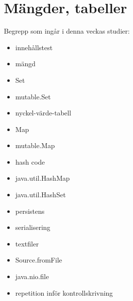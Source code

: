\chapter{Mängder, tabeller}\label{chapter:W07}
Begrepp som ingår i denna veckas studier:
\begin{itemize}[noitemsep,label={$\square$},leftmargin=*]
\item innehållstest
\item mängd
\item Set
\item mutable.Set
\item nyckel-värde-tabell
\item Map
\item mutable.Map
\item hash code
\item java.util.HashMap
\item java.util.HashSet
\item persistens
\item serialisering
\item textfiler
\item Source.fromFile
\item java.nio.file
\item repetition inför kontrollskrivning\end{itemize}
